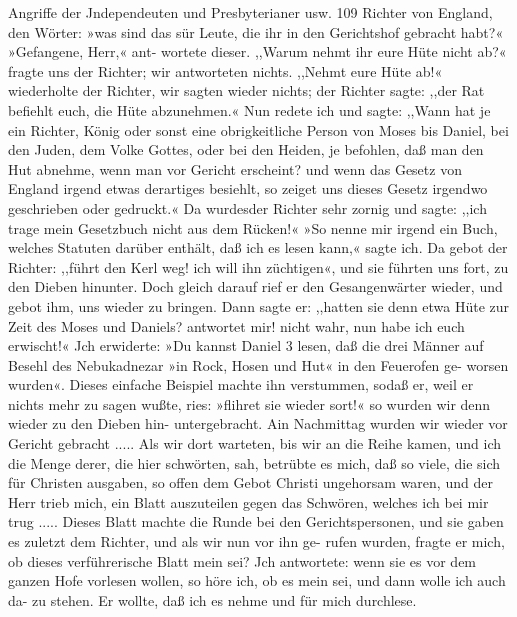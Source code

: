Angriffe der Jndependeuten und Presbyterianer usw. 109
Richter von England, den Wörter: »was sind das sür Leute, die
ihr in den Gerichtshof gebracht habt?« »Gefangene, Herr,« ant-
wortete dieser. ,,Warum nehmt ihr eure Hüte nicht ab?« fragte
uns der Richter; wir antworteten nichts. ,,Nehmt eure Hüte
ab!« wiederholte der Richter, wir sagten wieder nichts; der
Richter sagte: ,,der Rat befiehlt euch, die Hüte abzunehmen.«
Nun redete ich und sagte: ,,Wann hat je ein Richter, König oder
sonst eine obrigkeitliche Person von Moses bis Daniel, bei den
Juden, dem Volke Gottes, oder bei den Heiden, je befohlen, daß
man den Hut abnehme, wenn man vor Gericht erscheint? und
wenn das Gesetz von England irgend etwas derartiges besiehlt,
so zeiget uns dieses Gesetz irgendwo geschrieben oder gedruckt.«
Da wurdesder Richter sehr zornig und sagte: ,,ich trage mein
Gesetzbuch nicht aus dem Rücken!« »So nenne mir irgend ein
Buch, welches Statuten darüber enthält, daß ich es lesen kann,«
sagte ich. Da gebot der Richter: ,,führt den Kerl weg! ich will
ihn züchtigen«, und sie führten uns fort, zu den Dieben hinunter.
Doch gleich darauf rief er den Gesangenwärter wieder, und
gebot ihm, uns wieder zu bringen. Dann sagte er: ,,hatten sie
denn etwa Hüte zur Zeit des Moses und Daniels? antwortet
mir! nicht wahr, nun habe ich euch erwischt!« Jch erwiderte:
»Du kannst Daniel 3 lesen, daß die drei Männer auf Besehl des
Nebukadnezar »in Rock, Hosen und Hut« in den Feuerofen ge-
worsen wurden«. Dieses einfache Beispiel machte ihn verstummen,
sodaß er, weil er nichts mehr zu sagen wußte, ries: »flihret sie
wieder sort!« so wurden wir denn wieder zu den Dieben hin-
untergebracht. Ain Nachmittag wurden wir wieder vor Gericht
gebracht ..... Als wir dort warteten, bis wir an die Reihe
kamen, und ich die Menge derer, die hier schwörten, sah, betrübte
es mich, daß so viele, die sich für Christen ausgaben, so offen
dem Gebot Christi ungehorsam waren, und der Herr trieb mich,
ein Blatt auszuteilen gegen das Schwören, welches ich bei mir
trug .....
Dieses Blatt machte die Runde bei den Gerichtspersonen, und
sie gaben es zuletzt dem Richter, und als wir nun vor ihn ge-
rufen wurden, fragte er mich, ob dieses verführerische Blatt mein
sei? Jch antwortete: wenn sie es vor dem ganzen Hofe vorlesen
wollen, so höre ich, ob es mein sei, und dann wolle ich auch da-
zu stehen. Er wollte, daß ich es nehme und für mich durchlese.

